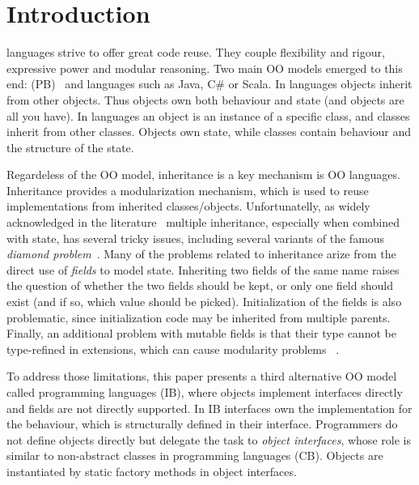 \section{Introduction}\label{sec:intro}

\Objectoriented languages strive to offer great code reuse.
They couple flexibility and rigour, expressive power and
modular reasoning.  Two main OO models emerged to this end:
\prototypebased (PB)~\cite{Ungar87self} and \classbased languages such as
Java, C\# or Scala.  In \prototypebased
languages objects inherit from other objects. Thus objects own
both behaviour and state (and objects are all you have).
In \classbased languages an object is an instance of a specific class,
and classes inherit from other classes.  Objects own state,
while classes contain behaviour and the structure of the state.

Regardeless of the OO model, inheritance is a key mechanism is OO 
languages. Inheritance provides a modularization mechanism, which 
is used to reuse implementations from inherited classes/objects. 
Unfortunatelly, as widely acknowledged in the literature~\cite{scharli03traits,Sak89dis,bracha90mixin,malayeri2009cz}
multiple inheritance, especially when combined with state, has several
tricky issues, including several variants of the famous 
\emph{diamond problem}~\cite{bracha90mixin,Sak89dis}. Many of the problems related to 
inheritance arize from the direct use of \emph{fields} to model state. 
Inheriting two fields of the same name raises 
the question of whether the two fields should be kept, or only one 
field should exist (and if so, which value should be picked). Initialization 
of the fields is also problematic, since initialization code may be inherited from 
multiple parents. Finally, an additional problem with mutable fields is that their 
type cannot be type-refined in extensions, which can cause modularity problems
~\cite{wadler98expression,eptrivially}.

To address those limitations, this paper presents a third alternative
OO model called \emph{\interfacebased} \objectoriented programming
languages (IB), where objects implement interfaces directly and fields
are not directly supported. In IB interfaces own the implementation for the
behaviour, which is structurally defined in their
interface. Programmers do not define objects directly but delegate the
task to \emph{object interfaces}, whose role is similar to
non-abstract classes in \classbased \objectoriented programming
languages (CB). Objects are instantiated by static factory methods in
object interfaces.

